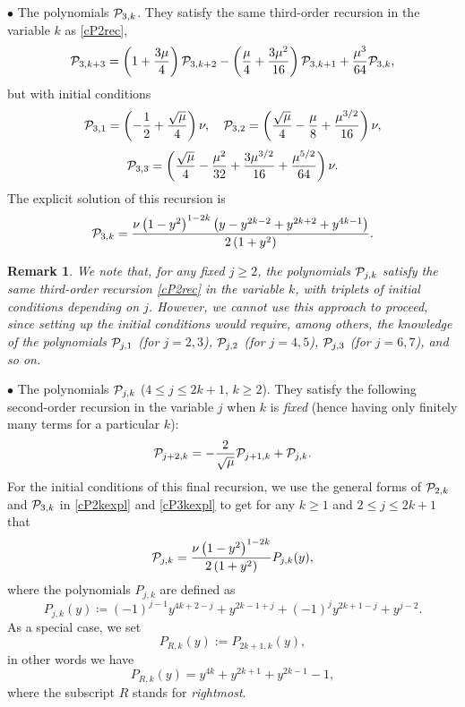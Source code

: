 \documentclass[smallextended,numbook,runningheads]{svjour3}     %
\newtheorem{remark}{Remark}
\newtheorem{remark}{Remark}
\newcommand{\Por}{P_{R,k}(y)}
\newcommand{\cP}{{\cal{P}}}
\begin{document}
$\bullet$  The polynomials $\cP_{3,k}$. They satisfy the same third-order recursion in the variable $k$ as \eqref{cP2rec},
\[
\cP_{3,k+3}=\left(1+\frac{3\mu}{4}\right)\cP_{3,k+2}-\left(\frac{\mu }{4}+\frac{3 \mu ^2}{16}\right)\cP_{3,k+1}+\frac{\mu ^3}{64}\cP_{3,k},
\]
but with initial conditions 
\[
\cP_{3,1}=\left(-\frac{1}{2}+\frac{\sqrt{\mu }}{4}\right) \nu, \quad \cP_{3,2}=\left(\frac{\sqrt{\mu} }{4}-\frac{\mu}{8}+\frac{\mu ^{3/2}}{16}\right) \nu,
\]
\[
\cP_{3,3}=\left(\frac{\sqrt{\mu }}{4}-\frac{\mu ^2}{32}+\frac{3 \mu ^{3/2}}{16}+\frac{\mu ^{5/2}}{64}\right) \nu.
\]
The explicit solution of this recursion is
\begin{equation}\label{cP3kexpl}
\cP_{3,k}=\frac{\nu  \left(1-y^2\right)^{1-2 k} \left(y-y^{2 k-2}+y^{2 k+2}+y^{4 k-1}\right)}{2 \left(1+y^2\right)}.
\end{equation}
\begin{remark}
We note that, for any \emph{fixed} $j\ge 2$, the polynomials $\cP_{j,k}$ satisfy the same third-order recursion \eqref{cP2rec} in the variable $k$, with triplets of initial conditions depending on $j$. However, we cannot use this approach to proceed, since setting up the initial conditions would require, among others, the knowledge of the  polynomials $\cP_{j,1}$ (for $j=2, 3$),  $\cP_{j,2}$ (for $j=4, 5$), $\cP_{j,3}$ (for $j=6, 7$), and so on. 
\end{remark}



$\bullet$  The polynomials $\cP_{j,k}$ ($4\le j\le 2k+1$, $k\ge 2$). They satisfy the following second-order recursion in the variable $j$ when $k$ is \emph{fixed} (hence having only finitely many terms for a particular $k$):  
\[
\cP_{j+2,k}=-\frac{2}{\sqrt{\mu }}\cP_{j+1,k}+\cP_{j,k}.
\]
For the initial conditions of this final recursion, we use the general forms of $\cP_{2,k}$ and $\cP_{3,k}$ in \eqref{cP2kexpl} and \eqref{cP3kexpl} to get for any $k\ge 1$ and $2\le j\le 2k+1$ that 
\begin{equation}\label{Pjkexpl}
\cP_{j,k}=\frac{\nu  \left(1-y^2\right)^{1-2 k}}{2 \left(1+y^2\right)}P_{j,k}(y), 
\end{equation}
where the polynomials $P_{j,k}$ are defined as
\begin{equation}\label{Pjky}
P_{j,k}(y)\coloneqq(-1)^{j-1} y^{4 k+2-j}+y^{2 k-1+j}+(-1)^j y^{2 k+1-j}+y^{j-2}.
\end{equation}
As a special case, we set
\[
\Por:=P_{2k+1,k}(y),
\]
in other words we have
\begin{equation}\label{pordef}
\Por=y^{4 k}+y^{2 k+1}+y^{2 k-1}-1,
\end{equation}
where the subscript $R$ stands for \textit{rightmost}.
\end{document}
